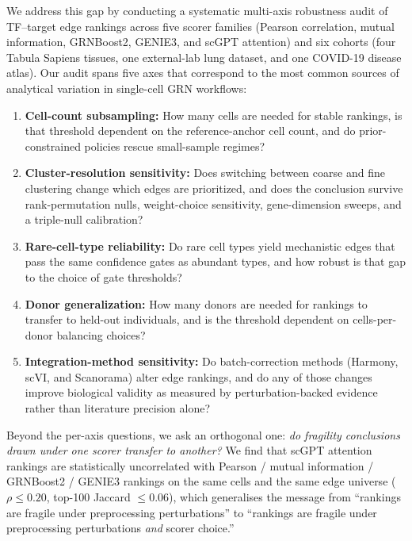 \documentclass[12pt]{article}
\begin{document}
We address this gap by conducting a systematic multi-axis robustness audit
of TF--target edge rankings across five scorer families (Pearson correlation,
mutual information, GRNBoost2, GENIE3, and scGPT attention) and six cohorts
(four Tabula Sapiens tissues, one external-lab lung dataset, and one
COVID-19 disease atlas). Our audit spans
five axes that correspond to the most common sources of analytical variation
in single-cell GRN workflows:

\begin{enumerate}
\item \textbf{Cell-count subsampling:} How many cells are needed for stable
      rankings, is that threshold dependent on the reference-anchor cell
      count, and do prior-constrained policies rescue small-sample regimes?
\item \textbf{Cluster-resolution sensitivity:} Does switching between coarse
      and fine clustering change which edges are prioritized, and does the
      conclusion survive rank-permutation nulls, weight-choice sensitivity,
      gene-dimension sweeps, and a triple-null calibration?
\item \textbf{Rare-cell-type reliability:} Do rare cell types yield
      mechanistic edges that pass the same confidence gates as abundant
      types, and how robust is that gap to the choice of gate thresholds?
\item \textbf{Donor generalization:} How many donors are needed for rankings
      to transfer to held-out individuals, and is the threshold dependent
      on cells-per-donor balancing choices?
\item \textbf{Integration-method sensitivity:} Do batch-correction
      methods (Harmony, scVI, and Scanorama) alter edge rankings, and do
      any of those changes improve biological validity as measured by
      perturbation-backed evidence rather than literature precision alone?
\end{enumerate}

Beyond the per-axis questions, we ask an orthogonal one: \emph{do
fragility conclusions drawn under one scorer transfer to another?}
We find that scGPT attention rankings are statistically uncorrelated
with Pearson / mutual information / GRNBoost2 / GENIE3 rankings on the
same cells and the same edge universe ($\rho \leq 0.20$, top-100
Jaccard $\leq 0.06$), which generalises the message from ``rankings
are fragile under preprocessing perturbations'' to ``rankings are
fragile under preprocessing perturbations \emph{and} scorer choice.''
\end{document}
